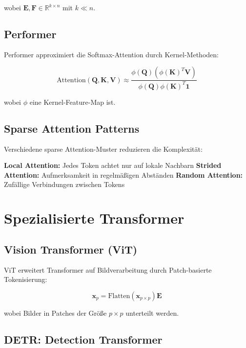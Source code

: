 wobei $\mathbf{E}, \mathbf{F} \in \mathbb{R}^{k \times n}$ mit $k \ll n$.

\subsection{Performer}

Performer approximiert die Softmax-Attention durch Kernel-Methoden:

\begin{equation}
\text{Attention}(\mathbf{Q}, \mathbf{K}, \mathbf{V}) \approx \frac{\phi(\mathbf{Q})(\phi(\mathbf{K})^T\mathbf{V})}{\phi(\mathbf{Q})\phi(\mathbf{K})^T\mathbf{1}}
\end{equation}

wobei $\phi$ eine Kernel-Feature-Map ist.

\subsection{Sparse Attention Patterns}

Verschiedene sparse Attention-Muster reduzieren die Komplexität:

\textbf{Local Attention:} Jedes Token achtet nur auf lokale Nachbarn
\textbf{Strided Attention:} Aufmerksamkeit in regelmäßigen Abständen
\textbf{Random Attention:} Zufällige Verbindungen zwischen Tokens

\section{Spezialisierte Transformer}

\subsection{Vision Transformer (ViT)}

ViT erweitert Transformer auf Bildverarbeitung durch Patch-basierte Tokenisierung:

\begin{equation}
\mathbf{x}_p = \text{Flatten}(\mathbf{x}_{p \times p}) \mathbf{E}
\end{equation}

wobei Bilder in Patches der Größe $p \times p$ unterteilt werden.

\subsection{DETR: Detection Transformer}

